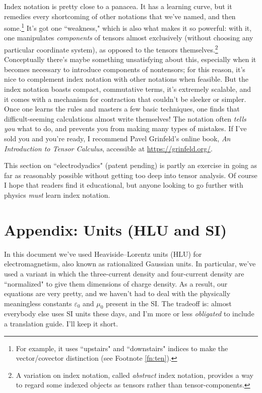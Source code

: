 \documentclass[12pt]{article}
\begin{document}
Index notation is pretty close to a panacea. It has a learning curve, but it remedies every shortcoming of other notations that we've named, and then some.\footnote{For example, it uses ``upstairs" and ``downstairs" indices to make the vector/covector distinction (see Footnote \ref{fn:ten}).} It's got one ``weakness," which is also what makes it so powerful: with it, one manipulates \emph{components} of tensors almost exclusively (without choosing any particular coordinate system), as opposed to the tensors themselves.\footnote{A variation on index notation, called \emph{abstract} index notation, provides a way to regard some indexed objects as tensors rather than tensor-components.} Conceptually there's maybe something unsatisfying about this, especially when it becomes necessary to introduce components of nontensors; for this reason, it's nice to complement index notation with other notations when feasible. But the index notation boasts compact, commutative terms, it's extremely scalable, and it comes with a mechanism for contraction that couldn't be sleeker or simpler. Once one learns the rules and masters a few basic techniques, one finds that difficult-seeming calculations almost write themselves! The notation often \emph{tells you} what to do, and prevents you from making many types of mistakes. If I've sold you and you're ready, I recommend Pavel Grinfeld's online book, \emph{An Introduction to Tensor Calculus}, accessible at \url{https://grinfeld.org/}.

This section on ``electrodyadics" (patent pending) is partly an exercise in going as far as reasonably possible without getting too deep into tensor analysis. Of course I hope that readers find it educational, but anyone looking to go further with physics \emph{must} learn index notation.

\clearpage

\section*{Appendix: Units (HLU and SI)}\label{sec:appendix}

In this document we've used Heaviside--Lorentz units (HLU) for electromagnetism, also known as rationalized Gaussian units. In particular, we've used a variant in which the three-current density and four-current density are ``normalized" to give them dimensions of charge density. As a result, our equations are very pretty, and we haven't had to deal with the physically meaningless constants $\varepsilon_0$ and $\mu_0$ present in the SI. The tradeoff is: almost everybody else uses SI units these days, and I'm more or less \emph{obligated} to include a translation guide. I'll keep it short.
\end{document}
